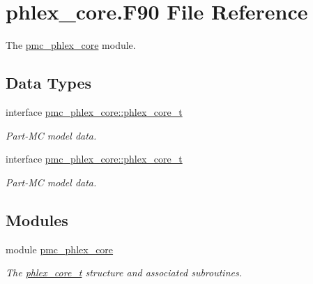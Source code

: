 \hypertarget{phlex__core_8_f90}{}\section{phlex\+\_\+core.\+F90 File Reference}
\label{phlex__core_8_f90}


The \mbox{\hyperlink{namespacepmc__phlex__core}{pmc\+\_\+phlex\+\_\+core}} module.  


\subsection*{Data Types}
\begin{DoxyCompactItemize}
\item 
interface \mbox{\hyperlink{structpmc__phlex__core_1_1phlex__core__t}{pmc\+\_\+phlex\+\_\+core\+::phlex\+\_\+core\+\_\+t}}
\begin{DoxyCompactList}\small\item\em Part-\/\+MC model data. \end{DoxyCompactList}\item 
interface \mbox{\hyperlink{structpmc__phlex__core_1_1phlex__core__t}{pmc\+\_\+phlex\+\_\+core\+::phlex\+\_\+core\+\_\+t}}
\begin{DoxyCompactList}\small\item\em Part-\/\+MC model data. \end{DoxyCompactList}\end{DoxyCompactItemize}
\subsection*{Modules}
\begin{DoxyCompactItemize}
\item 
module \mbox{\hyperlink{namespacepmc__phlex__core}{pmc\+\_\+phlex\+\_\+core}}
\begin{DoxyCompactList}\small\item\em The \mbox{\hyperlink{structpmc__phlex__core_1_1phlex__core__t}{phlex\+\_\+core\+\_\+t}} structure and associated subroutines. \end{DoxyCompactList}\end{DoxyCompactItemize}
